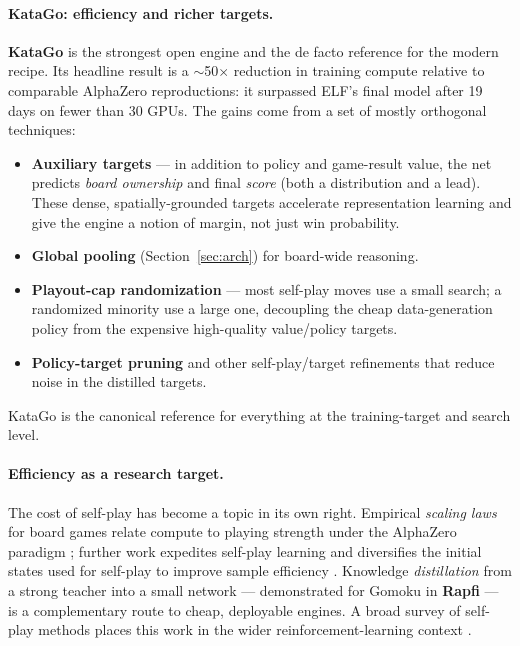 \documentclass[11pt]{article}
\begin{document}
\paragraph{KataGo: efficiency and richer targets.}
\textbf{KataGo} \cite{katago2019} is the strongest open engine and the de facto reference
for the modern recipe. Its headline result is a $\sim$50$\times$ reduction in training
compute relative to comparable AlphaZero reproductions: it surpassed ELF's final model after
19 days on fewer than 30 GPUs. The gains come from a set of mostly orthogonal techniques:
\begin{itemize}[noitemsep]
  \item \textbf{Auxiliary targets} --- in addition to policy and game-result value, the net
        predicts \emph{board ownership} and final \emph{score} (both a distribution and a
        lead). These dense, spatially-grounded targets accelerate representation learning
        and give the engine a notion of margin, not just win probability.
  \item \textbf{Global pooling} (Section~\ref{sec:arch}) for board-wide reasoning.
  \item \textbf{Playout-cap randomization} --- most self-play moves use a small search; a
        randomized minority use a large one, decoupling the cheap data-generation policy
        from the expensive high-quality value/policy targets.
  \item \textbf{Policy-target pruning} and other self-play/target refinements that reduce
        noise in the distilled targets.
\end{itemize}
KataGo is the canonical reference for everything at the training-target and search level.

\paragraph{Efficiency as a research target.}
The cost of self-play has become a topic in its own right. Empirical \emph{scaling laws} for
board games relate compute to playing strength under the AlphaZero paradigm
\cite{scalinglaws2021}; further work expedites self-play learning
\cite{expediting2023} and diversifies the initial states used for self-play to improve
sample efficiency \cite{initstate2024}. Knowledge \emph{distillation} from a strong teacher
into a small network --- demonstrated for Gomoku in \textbf{Rapfi} \cite{rapfi2025} --- is a
complementary route to cheap, deployable engines. A broad survey of self-play methods places
this work in the wider reinforcement-learning context \cite{selfplaysurvey2025}.
\end{document}
